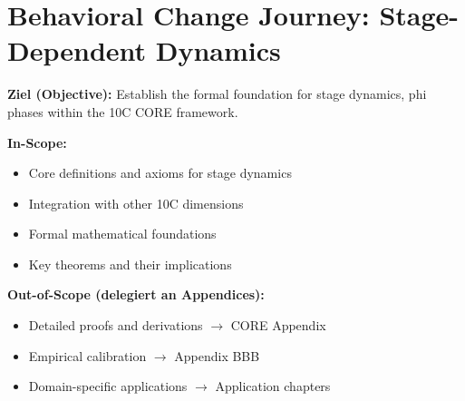 %
%
%
%

\chapter{Behavioral Change Journey: Stage-Dependent Dynamics}
\label{ch:bcj}

\begin{tcolorbox}[
    colback=purple!5!white,
    colframe=purple!75!black,
    title={\textbf{Chapter Scope: Ziel / In-Scope / Out-of-Scope}},
    fonttitle=\bfseries
]

\textbf{Ziel (Objective):}
Establish the formal foundation for stage dynamics, phi phases within the 10C CORE framework.

\vspace{0.3cm}
\textbf{In-Scope:}
\begin{itemize}[nosep]
    \item Core definitions and axioms for stage dynamics
    \item Integration with other 10C dimensions
    \item Formal mathematical foundations
    \item Key theorems and their implications
\end{itemize}

\vspace{0.3cm}
\textbf{Out-of-Scope (delegiert an Appendices):}
\begin{itemize}[nosep]
    \item Detailed proofs and derivations $\rightarrow$ CORE Appendix
    \item Empirical calibration $\rightarrow$ Appendix BBB
    \item Domain-specific applications $\rightarrow$ Application chapters
\end{itemize}

\end{tcolorbox}



